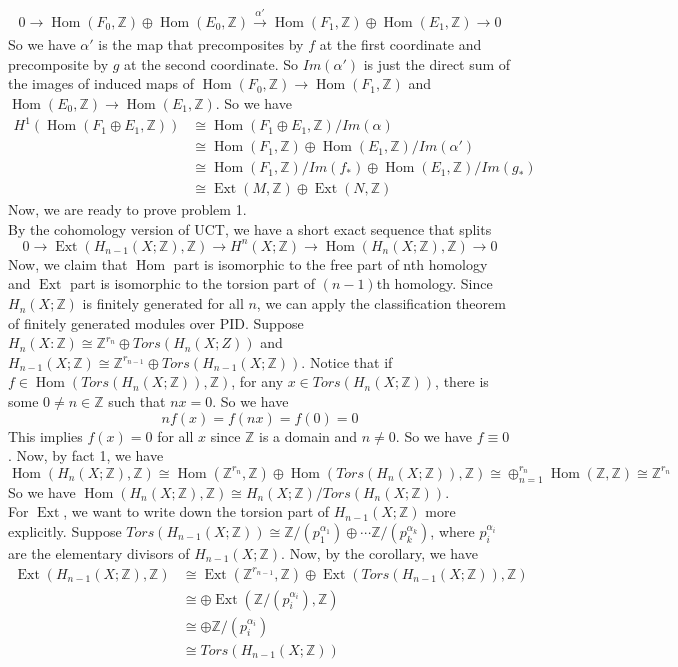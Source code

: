 \documentclass[12pt]{amsart}
\newcommand{\Z}{\mathbb{Z}}
\newcommand{\Hom}{\operatorname{Hom}}
\newcommand{\Ext}{\operatorname{Ext}}
\begin{document}
\[0\to \Hom(F_0,\Z)\oplus\Hom(E_0,\Z)\xrightarrow[]{\alpha'}\Hom(F_1,\Z)\oplus\Hom(E_1,\Z)\to 0\]
So we have $\alpha'$ is the map that precomposites by $f$ at the first coordinate and precomposite by $g$ at the second coordinate. So $Im(\alpha')$ is just the direct sum of the images of induced maps of $\Hom(F_0,\Z)\to \Hom(F_1,\Z)$ and $\Hom(E_0,\Z)\to \Hom(E_1,\Z)$. So we have 
\begin{align*}
    H^1(\Hom(F_1\oplus E_1,\Z))&\cong \Hom(F_1\oplus E_1,\Z)/Im(\alpha)\\
    &\cong\Hom(F_1,\Z)\oplus\Hom(E_1,\Z)/ Im(\alpha')\\
    &\cong\Hom(F_1,\Z)/Im(f_\ast)\oplus\Hom(E_1,\Z)/ Im(g_\ast)\\
    &\cong \Ext(M,\Z)\oplus \Ext(N,\Z) 
\end{align*}
Now, we are ready to prove problem 1.\\
By the cohomology version of UCT, we have a short exact sequence that splits
\[0\to \Ext(H_{n-1}(X;\Z),\Z)\to H^n(X;\Z)\to \Hom(H_n(X;\Z),\Z)\to 0\]
Now, we claim that $\Hom$ part is isomorphic to the free part of nth homology and $\Ext$ part is isomorphic to the torsion part of $(n-1)$th homology. Since $H_n(X;\Z)$ is finitely generated for all $n$, we can apply the classification theorem of finitely generated modules over PID. Suppose $H_n(X:\Z)\cong \Z^{r_n}\oplus Tors(H_n(X;Z))$ and $H_{n-1}(X;\Z)\cong \Z^{r_{n-1}}\oplus Tors(H_{n-1}(X;\Z))$.
Notice that if $f\in \Hom(Tors(H_n(X;\Z)),\Z)$, for any $x\in Tors(H_n(X;\Z))$, there is some $0\neq n\in\Z$ such that $nx=0$. So we have 
\[nf(x)=f(nx)=f(0)=0\]
This implies $f(x)=0$ for all $x$ since $\Z$ is a domain and $n\neq 0$. So we have $f\equiv 0$. Now, by fact 1, we have
\[\Hom(H_n(X;\Z),\Z)\cong \Hom(\Z^{r_n},\Z)\oplus \Hom(Tors(H_n(X;\Z)),\Z)\cong \oplus_{n=1}^{r_n}\Hom(\Z,\Z)\cong \Z^{r_n}\]
So we have $\Hom(H_n(X;\Z),\Z)\cong H_n(X;\Z)/Tors(H_n(X;\Z))$.\\
For $\Ext$, we want to write down the torsion part of $H_{n-1}(X;\Z)$ more explicitly. Suppose $Tors(H_{n-1}(X;\Z))\cong \Z/(p_1^{\alpha_1})\oplus \cdots \Z/(p_k^{\alpha_k})$, where $p_i^{\alpha_i}$ are the elementary divisors of $H_{n-1}(X;\Z)$. Now, by the corollary, we have 
\begin{align*}
    \Ext(H_{n-1}(X;\Z),\Z)&\cong\Ext(\Z^{r_{n-1}},\Z)\oplus\Ext(Tors(H_{n-1}(X;\Z)),\Z)\\
    &\cong\oplus \Ext(\Z/(p_i^{\alpha_i}),\Z)\\
    &\cong \oplus \Z/(p_i^{\alpha_i})\\
    &\cong Tors(H_{n-1}(X;\Z))  
\end{align*}
\end{document}
